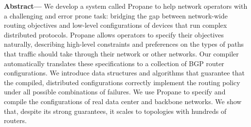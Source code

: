 \documentclass[10pt]{sigalternate052015} %
\newcommand{\sysname}{{\small \sf Propane}\xspace}
\providecommand{\DIFadd}[1]{{\protect\color{blue}\uwave{#1}}} %
\providecommand{\DIFaddbegin}{} %
\providecommand{\DIFaddend}{} %
\begin{document}

\textbf{Abstract---}
We develop a system called \sysname to help network operators with a challenging and error prone task: bridging the gap between network-wide routing objectives and low-level configurations of devices that run complex distributed protocols.
%
\sysname allows operators to specify their objectives naturally, describing high-level constraints and preferences on the types of paths that traffic should take through their network or other networks.
%
Our compiler automatically translates these specifications to a collection of BGP router configurations.
%
We introduce data structures and algorithms that guarantee that the compiled, distributed configurations correctly implement the routing policy under all possible combinations of failures.
%
We use \sysname to specify and compile the configurations of real
data center and backbone networks.  We show that, despite its strong guarantees, it scales to topologies with hundreds \DIFaddbegin \DIFadd{to thousands }\DIFaddend of routers.
\end{document}

